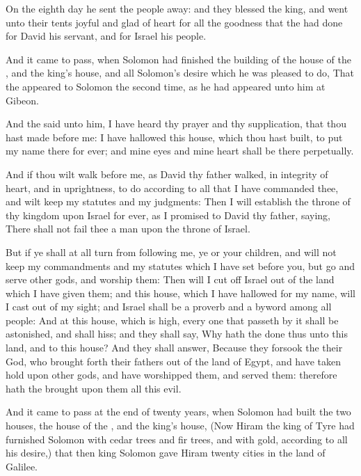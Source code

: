 \Verse On the eighth day he sent the people away: and they blessed the king, and went unto their tents joyful and glad of heart for all the goodness that the \LORD had done for David his servant, and for Israel his people.


\Chapter
\Verse And it came to pass, when Solomon had finished the building of the house of the \LORD, and the king's house, and all Solomon's desire which he was pleased to do, \Verse That the \LORD appeared to Solomon the second time, as he had appeared unto him at Gibeon.

\Verse And the \LORD said unto him, I have heard thy prayer and thy supplication, that thou hast made before me: I have hallowed this house, which thou hast built, to put my name there for ever; and mine eyes and mine heart shall be there perpetually.

\Verse And if thou wilt walk before me, as David thy father walked, in integrity of heart, and in uprightness, to do according to all that I have commanded thee, and wilt keep my statutes and my judgments: \Verse Then I will establish the throne of thy kingdom upon Israel for ever, as I promised to David thy father, saying, There shall not fail thee a man upon the throne of Israel.

\Verse But if ye shall at all turn from following me, ye or your children, and will not keep my commandments and my statutes which I have set before you, but go and serve other gods, and worship them: \Verse Then will I cut off Israel out of the land which I have given them; and this house, which I have hallowed for my name, will I cast out of my sight; and Israel shall be a proverb and a byword among all people: \Verse And at this house, which is high, every one that passeth by it shall be astonished, and shall hiss; and they shall say, Why hath the \LORD done thus unto this land, and to this house?  \Verse And they shall answer, Because they forsook the \LORD their God, who brought forth their fathers out of the land of Egypt, and have taken hold upon other gods, and have worshipped them, and served them: therefore hath the \LORD brought upon them all this evil.

\Verse And it came to pass at the end of twenty years, when Solomon had built the two houses, the house of the \LORD, and the king's house, \Verse (Now Hiram the king of Tyre had furnished Solomon with cedar trees and fir trees, and with gold, according to all his desire,) that then king Solomon gave Hiram twenty cities in the land of Galilee.

